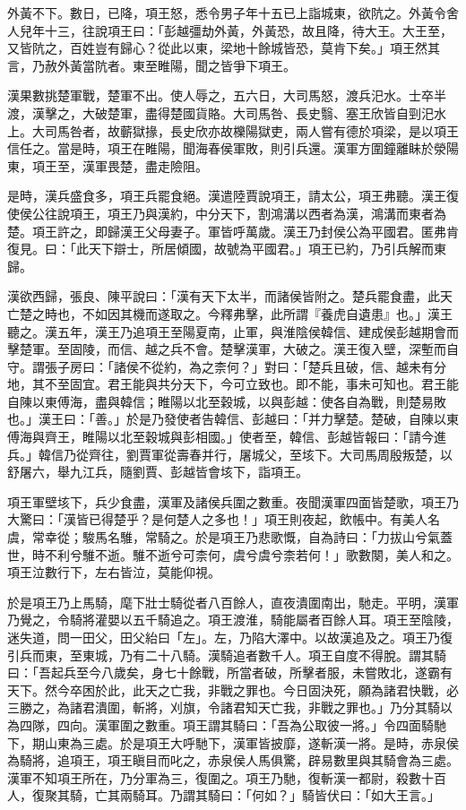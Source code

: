 \begin{pinyinscope}
外黃不下。數日，已降，項王怒，悉令男子年十五已上詣城東，欲阬之。外黃令舍人兒年十三，往說項王曰：「彭越彊劫外黃，外黃恐，故且降，待大王。大王至，又皆阬之，百姓豈有歸心？從此以東，梁地十餘城皆恐，莫肯下矣。」項王然其言，乃赦外黃當阬者。東至睢陽，聞之皆爭下項王。

漢果數挑楚軍戰，楚軍不出。使人辱之，五六日，大司馬怒，渡兵汜水。士卒半渡，漢擊之，大破楚軍，盡得楚國貨賂。大司馬咎、長史翳、塞王欣皆自剄汜水上。大司馬咎者，故蘄獄掾，長史欣亦故櫟陽獄吏，兩人嘗有德於項梁，是以項王信任之。當是時，項王在睢陽，聞海春侯軍敗，則引兵還。漢軍方圍鐘離眛於滎陽東，項王至，漢軍畏楚，盡走險阻。

是時，漢兵盛食多，項王兵罷食絕。漢遣陸賈說項王，請太公，項王弗聽。漢王復使侯公往說項王，項王乃與漢約，中分天下，割鴻溝以西者為漢，鴻溝而東者為楚。項王許之，即歸漢王父母妻子。軍皆呼萬歲。漢王乃封侯公為平國君。匿弗肯復見。曰：「此天下辯士，所居傾國，故號為平國君。」項王已約，乃引兵解而東歸。

漢欲西歸，張良、陳平說曰：「漢有天下太半，而諸侯皆附之。楚兵罷食盡，此天亡楚之時也，不如因其機而遂取之。今釋弗擊，此所謂『養虎自遺患』也。」漢王聽之。漢五年，漢王乃追項王至陽夏南，止軍，與淮陰侯韓信、建成侯彭越期會而擊楚軍。至固陵，而信、越之兵不會。楚擊漢軍，大破之。漢王復入壁，深塹而自守。謂張子房曰：「諸侯不從約，為之柰何？」對曰：「楚兵且破，信、越未有分地，其不至固宜。君王能與共分天下，今可立致也。即不能，事未可知也。君王能自陳以東傅海，盡與韓信；睢陽以北至穀城，以與彭越：使各自為戰，則楚易敗也。」漢王曰：「善。」於是乃發使者告韓信、彭越曰：「并力擊楚。楚破，自陳以東傅海與齊王，睢陽以北至穀城與彭相國。」使者至，韓信、彭越皆報曰：「請今進兵。」韓信乃從齊往，劉賈軍從壽春并行，屠城父，至垓下。大司馬周殷叛楚，以舒屠六，舉九江兵，隨劉賈、彭越皆會垓下，詣項王。

項王軍壁垓下，兵少食盡，漢軍及諸侯兵圍之數重。夜聞漢軍四面皆楚歌，項王乃大驚曰：「漢皆已得楚乎？是何楚人之多也！」項王則夜起，飲帳中。有美人名虞，常幸從；駿馬名騅，常騎之。於是項王乃悲歌慨，自為詩曰：「力拔山兮氣蓋世，時不利兮騅不逝。騅不逝兮可柰何，虞兮虞兮柰若何！」歌數闋，美人和之。項王泣數行下，左右皆泣，莫能仰視。

於是項王乃上馬騎，麾下壯士騎從者八百餘人，直夜潰圍南出，馳走。平明，漢軍乃覺之，令騎將灌嬰以五千騎追之。項王渡淮，騎能屬者百餘人耳。項王至陰陵，迷失道，問一田父，田父紿曰「左」。左，乃陷大澤中。以故漢追及之。項王乃復引兵而東，至東城，乃有二十八騎。漢騎追者數千人。項王自度不得脫。謂其騎曰：「吾起兵至今八歲矣，身七十餘戰，所當者破，所擊者服，未嘗敗北，遂霸有天下。然今卒困於此，此天之亡我，非戰之罪也。今日固決死，願為諸君快戰，必三勝之，為諸君潰圍，斬將，刈旗，令諸君知天亡我，非戰之罪也。」乃分其騎以為四隊，四向。漢軍圍之數重。項王謂其騎曰：「吾為公取彼一將。」令四面騎馳下，期山東為三處。於是項王大呼馳下，漢軍皆披靡，遂斬漢一將。是時，赤泉侯為騎將，追項王，項王瞋目而叱之，赤泉侯人馬俱驚，辟易數里與其騎會為三處。漢軍不知項王所在，乃分軍為三，復圍之。項王乃馳，復斬漢一都尉，殺數十百人，復聚其騎，亡其兩騎耳。乃謂其騎曰：「何如？」騎皆伏曰：「如大王言。」


\end{pinyinscope}
